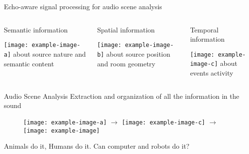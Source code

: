 \begin{frame}[t]{Echo-aware signal processing for \alert{audio scene analysis}}

    \begin{columns}
        \begin{column}[t]{0.3\textwidth}
            \centering
            \alert{Semantic} information

            \vspace*{0.5em}
            \texttt{[image: example-image-a]}
            about source nature and semantic content
        \end{column}
        \begin{column}[t]{0.3\textwidth}
            \centering
            \alert{Spatial} information

            \vspace*{0.5em}
            \texttt{[image: example-image-b]}
            about source position and room geometry
        \end{column}
        \begin{column}[t]{0.3\textwidth}
            \centering
            \alert{Temporal} information

            \vspace*{0.5em}
            \texttt{[image: example-image-c]}
            about events activity
        \end{column}
    \end{columns}

    \vfill
    \begin{mydefblock}{Audio Scene Analysis}
        Extraction and organization of all the information in the sound
    \end{mydefblock}

    \vfill
    \begin{figure}
        \centering
        \texttt{[image: example-image-a]}
        \hfill
        $\rightarrow$
        \hfill
        \texttt{[image: example-image-c]}
        \hfill
        $\rightarrow$
        \hfill
        \texttt{[image: example-image]}
    \end{figure}

    Animals do it, Humans do it. Can computer and robots do it?

\end{frame}


